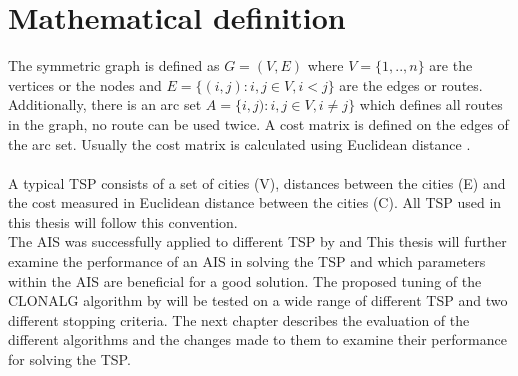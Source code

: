 \section{Mathematical definition}
The symmetric graph is defined as $G=(V,E)$ where $V=\{1,..,n\}$ are the vertices or the nodes and $E=\{(i,j):i,j\in V, i<j\}$ are the edges or routes. Additionally, there is an arc set $A=\{i,j):i,j\in V, i\neq j\}$ which defines all routes in the graph, no route can be used twice. A cost matrix is defined on the edges of the arc set. Usually the cost matrix is calculated using Euclidean distance \cite{Matai10}.\\\\
A typical TSP consists of a set of cities (V), distances between the cities (E) and the cost measured in Euclidean distance between the cities (C). All TSP used in this thesis will follow this convention.\\
The AIS was successfully applied to different TSP by \cite{DEC02} and \cite{RIFF09} This thesis will further examine the performance of an AIS in solving the TSP and which parameters within the AIS are beneficial for a good solution. The proposed tuning of the CLONALG algorithm by \cite{DEC02} will be tested on a wide range of different TSP and two different stopping criteria.
 The next chapter describes the evaluation of the different algorithms and the changes made to them to examine their performance for solving the TSP.


 


